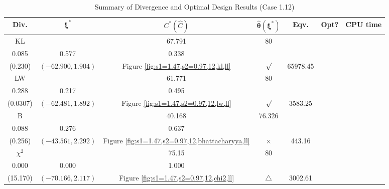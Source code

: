 \documentclass[12pt, a4paper]{article}
\begin{document}
\begin{table}[H]
\centering
\renewcommand{\arraystretch}{1.5} %
\setlength{\tabcolsep}{8pt} %
\begin{tabular}{|c|c|c|c|c|c|c|}
\hline
\textbf{Div.} & \(\boldsymbol{\xi^*}\) & \(C^* (\hat{C})\) & \(\boldsymbol{\hat{\theta}(\xi^*)}\) & \textbf{Eqv.} & \textbf{Opt?} & \textbf{CPU time} \\
\hline
KL & \(\left\{\begin{array}{ccc}
52.007 & 67.791 & 80 \\
0.085 & 0.577 & 0.338
\end{array}\right\}\) &
\(\begin{array}{c}
0.230 \\
(0.230)
\end{array}\) & 
\((-62.900, 1.904)\) & 
Figure \ref{fig:s1=1.47,s2=0.97,12,kl,ll} & $\surd$ & 65978.45 \\
\hline
LW & \(\left\{\begin{array}{ccc}
57.404 & 61.771 & 80 \\
0.288 & 0.217 & 0.495
\end{array}\right\}\) &
\(\begin{array}{c}
0.0315 \\
(0.0307)
\end{array}\) & 
\((-62.481, 1.892)\) & 
Figure \ref{fig:s1=1.47,s2=0.97,12,lw,ll} & $\surd$ & 3583.25 \\
\hline
B & \(\left\{\begin{array}{ccc}
15.502 & 40.168 & 76.326 \\
0.088 & 0.276 & 0.637
\end{array}\right\}\) &
\(\begin{array}{c}
0 \\
(0.256)
\end{array}\) & 
\((-43.561, 2.292)\) & 
Figure \ref{fig:s1=1.47,s2=0.97,12,bhattacharyya,ll} & $\times$ & 443.16 \\
\hline
\(\chi^2\) & \(\left\{\begin{array}{ccc}
20.27 & 75.15 & 80 \\
0.000 & 0.000 & 1.000
\end{array}\right\}\) &
\(\begin{array}{c}
4.44\times 10^{11} \\
(15.170)
\end{array}\) & 
\((-70.166, 2.117)\) & 
Figure \ref{fig:s1=1.47,s2=0.97,12,chi2,ll} & $\triangle$ & 3002.61 \\
\hline
\end{tabular}
\caption{Summary of Divergence and Optimal Design Results (Case 1.12)}
\label{tab:results1.12}
\end{table}
\end{document}
